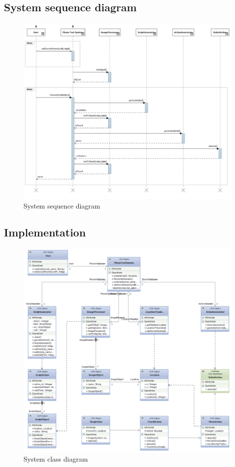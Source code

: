\subsection{System sequence diagram}
    \begin{figure}
		\centering
		\includegraphics[scale=0.75]{Chapters/Fig/sequence_diagram.png}
		\caption{System sequence diagram}
		\label{fig:sequence_diagram}
	\end{figure}

\subsection{Implementation}
    \begin{figure}
		\centering
		\includegraphics[scale=0.75]{Chapters/Fig/class_diagram.png}
		\caption{System class diagram}
		\label{fig:class_diagram}
	\end{figure}

